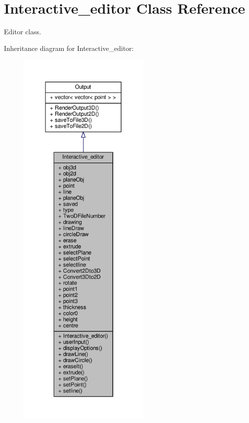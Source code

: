 \hypertarget{classInteractive__editor}{}\section{Interactive\+\_\+editor Class Reference}
\label{classInteractive__editor}


Editor class.  




Inheritance diagram for Interactive\+\_\+editor\+:
\nopagebreak
\begin{figure}[H]
\begin{center}
\leavevmode
\includegraphics[height=550pt]{classInteractive__editor__inherit__graph}
\end{center}
\end{figure}


